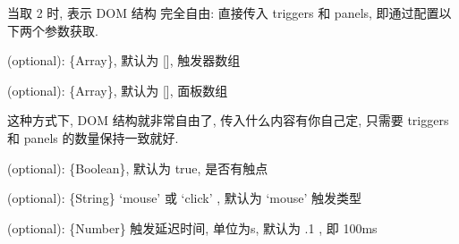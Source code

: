 \documentclass[letterpaper,10pt,english]{sphinxmanual}
\begin{document}
当取 2 时,  表示 DOM 结构 完全自由: 直接传入 triggers 和 panels, 即通过配置以下两个参数获取.


\begin{fulllineitems}
\label{api/component/switchable/switchable:Switchable.Switchable.triggers}
(optional): \{Array\}, 默认为 {[}{]}, 触发器数组

\end{fulllineitems}



\begin{fulllineitems}
\label{api/component/switchable/switchable:Switchable.Switchable.panels}
(optional): \{Array\}, 默认为 {[}{]}, 面板数组

\end{fulllineitems}


这种方式下, DOM 结构就非常自由了, 传入什么内容有你自己定, 只需要 triggers 和 panels 的数量保持一致就好.


\begin{fulllineitems}
\label{api/component/switchable/switchable:Switchable.Switchable.hasTriggers}
(optional): \{Boolean\}, 默认为 true, 是否有触点

\end{fulllineitems}



\begin{fulllineitems}
\label{api/component/switchable/switchable:Switchable.Switchable.triggerType}
(optional): \{String\} `mouse' 或 `click' , 默认为 `mouse' 触发类型

\end{fulllineitems}



\begin{fulllineitems}
\label{api/component/switchable/switchable:Switchable.Switchable.delay}
(optional): \{Number\} 触发延迟时间, 单位为s,  默认为 .1 , 即 100ms

\end{fulllineitems}
\end{document}

